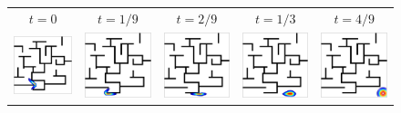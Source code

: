 \begin{figure}[!ht]
\begin{center}
\begin{tabular}{ccccc}
\hspace{-0.2cm}$t=0$&
\hspace{-0.4cm}$t=1/9$&
\hspace{-0.4cm}$t=2/9$&
\hspace{-0.4cm}$t=1/3$&
\hspace{-0.4cm}$t=4/9$\\
\hspace{-0.2cm}\includegraphics[width=3cm]{images/labyrinthe/bump_obstacle5_iso_056}&
\hspace{-0.4cm}\includegraphics[width=3cm]{images/labyrinthe/bump_obstacle5_iso_067}&
\hspace{-0.4cm}\includegraphics[width=3cm]{images/labyrinthe/bump_obstacle5_iso_078}&
\hspace{-0.4cm}\includegraphics[width=3cm]{images/labyrinthe/bump_obstacle5_iso_089}&
\hspace{-0.4cm}\includegraphics[width=3cm]{images/labyrinthe/bump_obstacle5_iso_101}\\

\end{tabular}
\end{center}
\end{figure}
